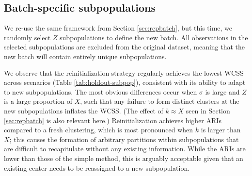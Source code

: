 \documentclass{article}
\begin{document}
\subsection{Batch-specific subpopulations}

We re-use the same framework from Section \ref{sec:repbatch}, but this time, we randomly select $Z$ subpopulations to define the new batch.
All observations in the selected subpopulations are excluded from the original dataset, meaning that the new batch will contain entirely unique subpopulations.

We observe that the reinitialization strategy regularly achieves the lowest WCSS across scenarios (Table \ref{tab:holdout-subpop}), consistent with its ability to adapt to new subpopulations.
The most obvious differences occur when $\sigma$ is large and $Z$ is a large proportion of $X$, such that any failure to form distinct clusters at the new subpopulations inflates the WCSS.
(The effect of $k \approx X$ seen in Section \ref{sec:repbatch} is also relevant here.)
Reinitialization achieves higher ARIs compared to a fresh clustering, which is most pronounced when $k$ is larger than $X$;
this causes the formation of arbitrary partitions within subpopulations that are difficult to recapitulate without any existing information.
While the ARIs are lower than those of the simple method, this is arguably acceptable given that an existing center needs to be reassigned to a new subpopulation.
\end{document}
